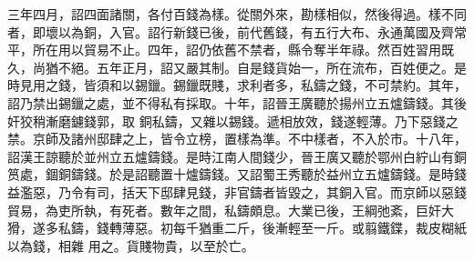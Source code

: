 \begin{pinyinscope}
 三年四月，詔四面諸關，各付百錢為樣。從關外來，勘樣相似，然後得過。樣不同者，即壞以為銅，入官。詔行新錢已後，前代舊錢，有五行大布、永通萬國及齊常平，所在用以貿易不止。四年，詔仍依舊不禁者，縣令奪半年祿。然百姓習用既久，尚猶不絕。五年正月，詔又嚴其制。自是錢貨始一，所在流布，百姓便之。是時見用之錢，皆須和以錫鑞。錫鑞既賤，求利者多，私鑄之錢，不可禁約。其年，詔乃禁出錫鑞之處，並不得私有採取。十年，詔晉王廣聽於揚州立五爐鑄錢。其後奸狡稍漸磨鑢錢郭，取
 銅私鑄，又雜以錫錢。遞相放效，錢遂輕薄。乃下惡錢之禁。京師及諸州邸肆之上，皆令立榜，置樣為準。不中樣者，不入於市。十八年，詔漢王諒聽於並州立五爐鑄錢。是時江南人間錢少，晉王廣又聽於鄂州白紵山有銅筼處，錮銅鑄錢。於是詔聽置十爐鑄錢。又詔蜀王秀聽於益州立五爐鑄錢。是時錢益濫惡，乃令有司，括天下邸肆見錢，非官鑄者皆毀之，其銅入官。而京師以惡錢貿易，為吏所執，有死者。數年之間，私鑄頗息。大業已後，王綱弛紊，巨奸大猾，遂多私鑄，錢轉薄惡。初每千猶重二斤，後漸輕至一斤。或翦鐵鍱，裁皮糊紙以為錢，相雜
 用之。貨賤物貴，以至於亡。



\end{pinyinscope}